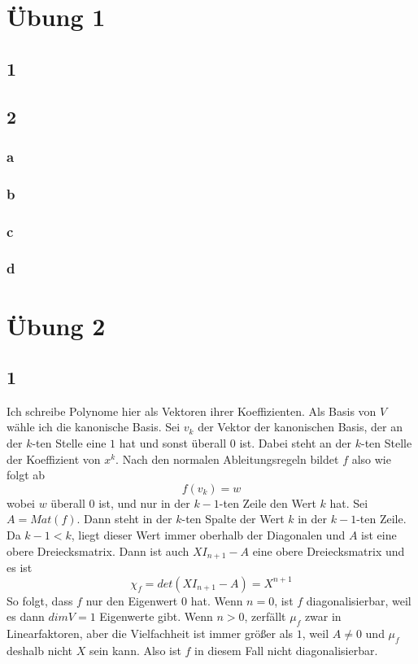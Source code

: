 \documentclass[10pt,a4paper]{article}
\begin{document}
\section*{Übung 1}

\subsection*{1}

\subsection*{2}

\subsubsection*{a}

\subsubsection*{b}

\subsubsection*{c}

\subsubsection*{d}

\section*{Übung 2}

\subsection*{1}

Ich schreibe Polynome hier als Vektoren ihrer Koeffizienten.
Als Basis von $V$ wähle ich die kanonische Basis.
Sei $v_{k}$ der Vektor der kanonischen Basis, der an der $k$-ten Stelle eine $1$ hat und sonst überall $0$ ist.
Dabei steht an der $k$-ten Stelle der Koeffizient von $x^{k}$.
Nach den normalen Ableitungsregeln bildet $f$ also wie folgt ab
\begin{equation}
f(v_{k}) = w
\end{equation}
wobei $w$ überall $0$ ist, und nur in der $k - 1$-ten Zeile den Wert $k$ hat.
Sei $A = Mat(f)$.
Dann steht in der $k$-ten Spalte der Wert $k$ in der $k - 1$-ten Zeile.
Da $k - 1 < k$, liegt dieser Wert immer oberhalb der Diagonalen und $A$ ist eine obere Dreiecksmatrix.
Dann ist auch $XI_{n + 1} - A$ eine obere Dreiecksmatrix und es ist
\begin{equation}
\chi_{f} = det(XI_{n + 1} - A) = X^{n + 1}
\end{equation}
So folgt, dass $f$ nur den Eigenwert $0$ hat.
Wenn $n = 0$, ist $f$ diagonalisierbar, weil es dann $dim V = 1$ Eigenwerte gibt.
Wenn $n > 0$, zerfällt $\mu_{f}$ zwar in Linearfaktoren, aber die Vielfachheit ist immer größer als $1$, weil $A \ne 0$ und $\mu_{f}$ deshalb nicht $X$ sein kann.
Also ist $f$ in diesem Fall nicht diagonalisierbar.
\end{document}
